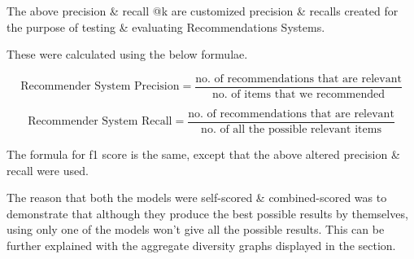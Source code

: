 The above precision \& recall @k are customized precision \& recalls created for the purpose of testing \& evaluating Recommendations Systems.

These were calculated using the below formulae.

\vspace{-4mm}

\[\text{Recommender System Precision} = \frac{\text{no. of recommendations that are relevant}}{\text{no. of items that we recommended}}\]

\[\text{Recommender System Recall} = \frac{\text{no. of recommendations that are relevant}}{\text{no. of all the possible relevant items}}\]

\noindent The formula for f1 score is the same, except that the above altered precision \& recall were used.


The reason that both the models were self-scored \& combined-scored was to demonstrate that although they produce the best possible results by themselves, using only one of the models won't give all the possible results. This can be further explained with the aggregate diversity graphs displayed in the \textbf{} section.

